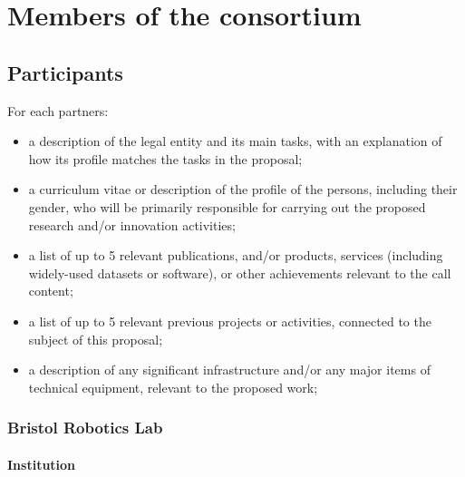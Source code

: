 \documentclass[]{article}
\begin{document}
\newpage

\section{Members of the consortium}\label{members-of-the-consortium}

\subsection{Participants}\label{participants}

For each partners:

\begin{itemize}

\item
  a description of the legal entity and its main tasks, with an
  explanation of how its profile matches the tasks in the proposal;
\item
  a curriculum vitae or description of the profile of the persons,
  including their gender, who will be primarily responsible for carrying
  out the proposed research and/or innovation activities;
\item
  a list of up to 5 relevant publications, and/or products, services
  (including widely-used datasets or software), or other achievements
  relevant to the call content;
\item
  a list of up to 5 relevant previous projects or activities, connected
  to the subject of this proposal;
\item
  a description of any significant infrastructure and/or any major items
  of technical equipment, relevant to the proposed work;
\end{itemize}

\subsubsection{Bristol Robotics Lab}\label{bristol-robotics-lab}

\paragraph{Institution}
\end{document}
